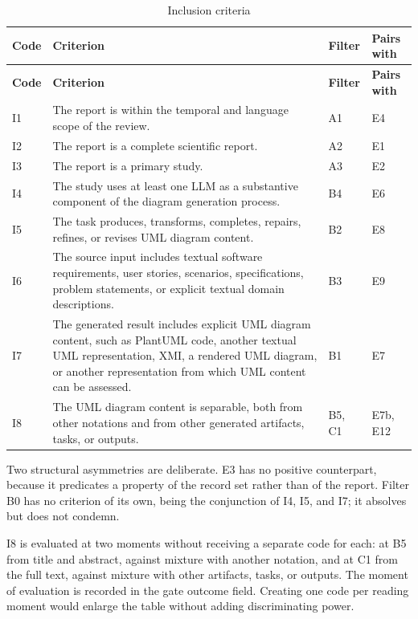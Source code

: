 \begin{longtable}{p{} p{} p{} p{}}
\caption{Inclusion criteria}
\label{tab:protocol_inclusion}\\
\toprule
\textbf{Code} & \textbf{Criterion} & \textbf{Filter} & \textbf{Pairs with} \\
\midrule
\endfirsthead
\toprule
\textbf{Code} & \textbf{Criterion} & \textbf{Filter} & \textbf{Pairs with} \\
\midrule
\endhead
I1 & The report is within the temporal and language scope of the review. & A1 & E4 \\
I2 & The report is a complete scientific report. & A2 & E1 \\
I3 & The report is a primary study. & A3 & E2 \\
I4 & The study uses at least one LLM as a substantive component of the diagram generation process. & B4 & E6 \\
I5 & The task produces, transforms, completes, repairs, refines, or revises UML diagram content. & B2 & E8 \\
I6 & The source input includes textual software requirements, user stories, scenarios, specifications, problem statements, or explicit textual domain descriptions. & B3 & E9 \\
I7 & The generated result includes explicit UML diagram content, such as PlantUML code, another textual UML representation, XMI, a rendered UML diagram, or another representation from which UML content can be assessed. & B1 & E7 \\
I8 & The UML diagram content is separable, both from other notations and from other generated artifacts, tasks, or outputs. & B5, C1 & E7b, E12 \\
\bottomrule
\end{longtable}

Two structural asymmetries are deliberate. E3 has no positive counterpart, because it predicates a property of the record set rather than of the report. Filter B0 has no criterion of its own, being the conjunction of I4, I5, and I7; it absolves but does not condemn.

I8 is evaluated at two moments without receiving a separate code for each: at B5 from title and abstract, against mixture with another notation, and at C1 from the full text, against mixture with other artifacts, tasks, or outputs. The moment of evaluation is recorded in the gate outcome field. Creating one code per reading moment would enlarge the table without adding discriminating power.


